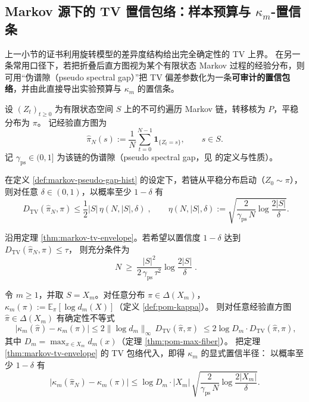 \subsection{Markov 源下的 TV 置信包络：样本预算与 \texorpdfstring{$\kappa_m$}{kappa}-置信条}\label{subsec:markov-tv-envelope}
上一小节的证书利用旋转模型的差异度结构给出完全确定性的 TV 上界。
在另一条常用口径下，若把折叠后直方图视为某个有限状态 Markov 过程的经验分布，则可用“伪谱隙（pseudo spectral gap）”把 TV 偏差参数化为一条\textbf{可审计的置信包络}，并由此直接导出实验预算与 \(\kappa_m\) 的置信条。

\begin{definition}[伪谱隙与经验直方图]\label{def:markov-pseudo-gap-hist}
设 \((Z_t)_{t\ge 0}\) 为有限状态空间 \(S\) 上的不可约遍历 Markov 链，转移核为 \(P\)，平稳分布为 \(\pi\)。
记经验直方图为
\[
\hat{\pi}_N(s):=\frac{1}{N}\sum_{t=0}^{N-1}\mathbf{1}_{\{Z_t=s\}},\qquad s\in S.
\]
记 \(\gamma_{\mathrm{ps}}\in(0,1]\) 为该链的伪谱隙（pseudo spectral gap，见 \cite{Paulin2015MarkovConcentration} 的定义与性质）。
\end{definition}

\begin{theorem}\label{thm:markov-tv-envelope}
在定义 \ref{def:markov-pseudo-gap-hist} 的设定下，若链从平稳分布启动（\(Z_0\sim\pi\)），则对任意 \(\delta\in(0,1)\)，以概率至少 \(1-\delta\) 有
\[
\boxed{\;
D_{\mathrm{TV}}(\hat{\pi}_N,\pi)\le \frac12|S|\,\eta(N,|S|,\delta)\;},
\qquad
\eta(N,|S|,\delta):=\sqrt{\frac{2}{\gamma_{\mathrm{ps}}\,N}\log\frac{2|S|}{\delta}}.
\]
\end{theorem}

\begin{corollary}\label{cor:markov-tv-sample-complexity}
沿用定理 \ref{thm:markov-tv-envelope}。若希望以置信度 \(1-\delta\) 达到
\(
D_{\mathrm{TV}}(\hat{\pi}_N,\pi)\le \tau
\)，
则充分条件为
\[
\boxed{\;
N\ \ge\ \frac{|S|^{2}}{2\,\gamma_{\mathrm{ps}}\,\tau^{2}}
\log\frac{2|S|}{\delta}\; }.
\]
\end{corollary}

\begin{corollary}\label{cor:kappa-confidence-from-tv}
令 \(m\ge 1\)，并取 \(S=X_m\)。对任意分布 \(\pi\in\Delta(X_m)\)，\(\kappa_m(\pi):=\mathbb{E}_{\pi}[\log d_m(X)]\)（定义 \ref{def:pom-kappa}）。
则对任意经验直方图 \(\hat{\pi}\in\Delta(X_m)\) 有确定性不等式
\[
\boxed{\;
\bigl|\kappa_m(\hat{\pi})-\kappa_m(\pi)\bigr|
\le 2\|\log d_m\|_{\infty}\,D_{\mathrm{TV}}(\hat{\pi},\pi)\;}
\le 2\log D_m\cdot D_{\mathrm{TV}}(\hat{\pi},\pi),
\]
其中 \(D_m=\max_{x\in X_m}d_m(x)\)（定理 \ref{thm:pom-max-fiber}）。
把定理 \ref{thm:markov-tv-envelope} 的 TV 包络代入，即得 \(\kappa_m\) 的显式置信半径：
以概率至少 \(1-\delta\) 有
\[
\bigl|\kappa_m(\hat{\pi}_N)-\kappa_m(\pi)\bigr|
\le \log D_m\cdot |X_m|\,
\sqrt{\frac{2}{\gamma_{\mathrm{ps}}\,N}\log\frac{2|X_m|}{\delta}}.
\]
\end{corollary}

